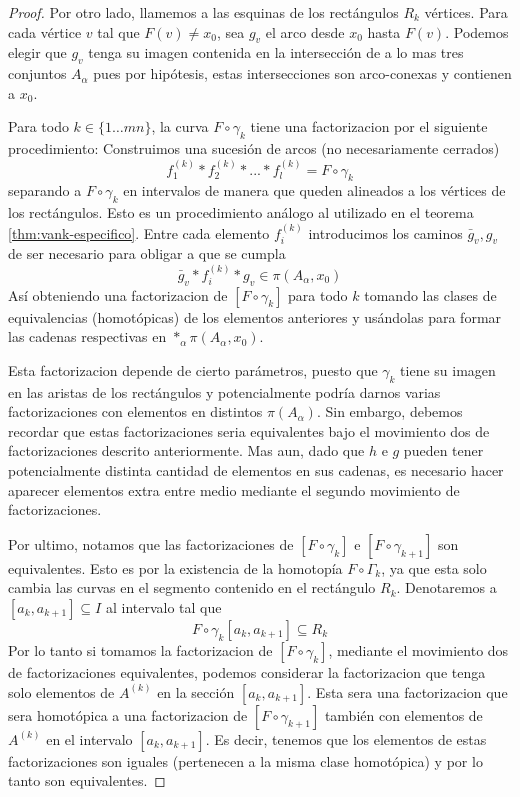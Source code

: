 \begin{proof}
  Por otro lado, llamemos a las esquinas de los rectángulos \(R_k\)
  vértices. Para cada vértice \(v\) tal que \(F (v) \neq x_0\), sea
  \(g_v\) el arco desde \(x_0\) hasta \(F(v)\). Podemos elegir que
  \(g_v\) tenga su imagen contenida en la intersección de a lo mas tres
  conjuntos \(A_\alpha\) pues por hipótesis, estas intersecciones son
  arco-conexas y contienen a \(x_0\).

  Para todo \(k \in \{1 \dots mn\}\), la curva \(F \circ \gamma_k\)
  tiene una factorizacion por el siguiente procedimiento: Construimos
  una sucesión de arcos (no necesariamente cerrados)
  \[ f_1^{(k)} * f_2^{(k)} * ... * f_l^{(k)} = F \circ \gamma_k \]
  separando a \(F \circ \gamma_k\) en intervalos de manera que queden
  alineados a los vértices de los rectángulos. Esto es un
  procedimiento análogo al utilizado en el teorema
  \ref{thm:vank-especifico}. Entre cada elemento \(f_i^{(k)}\)
  introducimos los caminos \(\bar g _v , g_v\) de ser necesario para
  obligar a que se cumpla
  \[\bar g _v * f_i^{(k)} * g_v \in \pi (A_\alpha, x_0)\]
  Así obteniendo una factorizacion de \([F \circ \gamma_k]\) para todo
  \(k\) tomando las clases de equivalencias (homotópicas) de los
  elementos anteriores y usándolas para formar las cadenas respectivas
  en \(*_\alpha \pi (A_\alpha, x_0)\).

  Esta factorizacion depende de cierto parámetros, puesto que \(\gamma_k\)
  tiene su imagen en las aristas de los rectángulos y potencialmente
  podría darnos varias factorizaciones con elementos en distintos \(\pi
  (A_\alpha)\). Sin embargo, debemos recordar que estas factorizaciones
  seria equivalentes bajo el movimiento dos de factorizaciones descrito
  anteriormente. Mas aun, dado que \(h\) e \(g\) pueden tener
  potencialmente distinta cantidad de elementos en sus cadenas, es
  necesario hacer aparecer elementos extra entre medio mediante el
  segundo movimiento de factorizaciones.

  Por ultimo, notamos que las factorizaciones de \([F \circ \gamma_k]\) e
  \([F \circ \gamma_{k+1}]\) son equivalentes. Esto es por la existencia
  de la homotopía \(F \circ \Gamma_k\), ya que esta solo cambia las curvas en
  el segmento contenido en el rectángulo \(R_k\). Denotaremos a \([a_k,
  a_{k+1}] \subseteq I\) al intervalo tal que \[F \circ \gamma_k [a_k ,
    a_{k+1}] \subseteq R_k\]
  Por lo tanto si
  tomamos la factorizacion de \([F \circ \gamma_{k}]\), mediante el
  movimiento dos de factorizaciones equivalentes, podemos considerar la
  factorizacion que tenga solo elementos de \(A^{(k)}\) en la sección \([a_k,
  a_{k+1}]\). Esta sera una factorizacion que sera homotópica a una
  factorizacion de \([F \circ \gamma_{k+1}]\) también con elementos de
  \(A^{(k)}\) en el intervalo \([a_k , a_{k+1}]\). Es decir, tenemos que los
  elementos de estas factorizaciones son iguales (pertenecen a la misma
  clase homotópica) y por lo tanto son equivalentes.



\end{proof}
